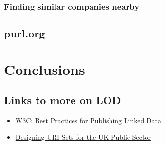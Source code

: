 \documentclass[11pt,twoside,a4paper]{article}
\begin{document}
    \subsubsection{Finding similar companies nearby}
    \label{sec:tech:nearby}
    \subsection{purl.org}

\section{Conclusions}
\subsection{Links to more on LOD}
    \begin{itemize}
      \item \href{https://www.w3.org/TR/ld-bp/}{W3C: Best Practices for Publishing Linked Data}
      \item \href{https://www.gov.uk/government/uploads/system/uploads/attachment_data/file/60975/designing-URI-sets-uk-public-sector.pdf}{Designing URI Sets for the UK Public Sector}
    \end{itemize}
\end{document}
